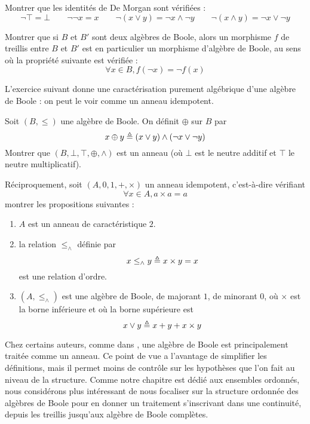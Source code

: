 \begin{exercise}
  Montrer que les identités de De Morgan sont vérifiées :
  \[\lnot \top = \bot \qquad \lnot\lnot x = x
  \qquad \lnot (x \lor y) = \lnot x \land \lnot y
  \qquad \lnot (x \land y) = \lnot x \lor \lnot y\]
\end{exercise}

\begin{exercise}
  Montrer que si $B$ et $B'$ sont deux algèbres de Boole, alors un morphisme $f$
  de treillis entre $B$ et $B'$ est en particulier un morphisme d'algèbre de
  Boole, au sens où la propriété suivante est vérifiée :
  \[\forall x \in B, f(\lnot x) = \lnot f(x)\]
\end{exercise}

L'exercice suivant donne une caractérisation purement algébrique d'une algèbre
de Boole : on peut le voir comme un anneau idempotent.

\begin{exercise}
  Soit $(B,\leq)$ une algèbre de Boole. On définit $\oplus$ sur $B$ par
  \[x\oplus y \triangleq (x\lor y) \land (\lnot x \lor \lnot y)\]
  Montrer que $(B,\bot,\top,\oplus,\land)$ est un anneau (où $\bot$ est le
  neutre additif et $\top$ le neutre multiplicatif).

  Réciproquement, soit $(A,0,1,+,\times)$ un anneau idempotent, c'est-à-dire
  vérifiant
  \[\forall x\in A, a\times a = a\]
  montrer les propositions suivantes :
  \begin{enumerate}[label=(\roman*)]
  \item $A$ est un anneau de caractéristique $2$.
  \item la relation $\leq_\land$ définie par
    \[x\leq_\land y \triangleq x\times y = x\]
    est une relation d'ordre.
  \item $(A,\leq_\land)$ est une algèbre de Boole, de majorant $1$, de minorant
    $0$, où $\times$ est la borne inférieure et où la borne supérieure est
    \[x\lor y \triangleq x + y + x \times y\]
  \end{enumerate}
\end{exercise}

\begin{remark}
  Chez certains auteurs, comme dans \cite{Halmos1966-HALLOB}, une algèbre de
  Boole est principalement traitée comme un anneau. Ce point de vue a
  l'avantage de simplifier les définitions, mais il permet moins de contrôle
  sur les hypothèses que l'on fait au niveau de la structure. Comme notre
  chapitre est dédié aux ensembles ordonnés, nous considérons plus intéressant
  de nous focaliser sur la structure ordonnée des algèbres de Boole pour en
  donner un traitement s'inscrivant dans une continuité, depuis les treillis
  jusqu'aux algèbre de Boole complètes.
\end{remark}

